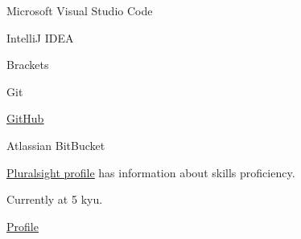 \documentclass[]{deedy-resume-openfont}
\begin{document}
\descript{}
\begin{tightemize}
\item Microsoft Visual Studio Code
\item IntelliJ IDEA
\item Brackets
\end{tightemize}
\sectionsep

\descript{}
\begin{tightemize}
\item Git
\item \href{https://github.com/sirkoik}{\underline{GitHub}}
\item Atlassian BitBucket
\end{tightemize}
\sectionsep

\descript{}
\begin{tightemize}
\item \href{https://app.pluralsight.com/profile/alexander-koik-cesto}{\underline{Pluralsight profile}} has information about skills proficiency.
\end{tightemize}
\sectionsep

\descript{}
\begin{tightemize}
\item Currently at 5 kyu.
\item \href{https://www.codewars.com/users/sirkoik}{\underline{Profile}}
\end{tightemize}


\end{document}
